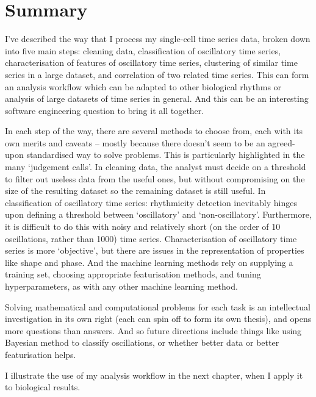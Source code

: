 \section{Summary}
\label{sec:analysis-summary}

I've described the way that I process my single-cell time series data, broken down into five main steps: cleaning data, classification of oscillatory time series, characterisation of features of oscillatory time series, clustering of similar time series in a large dataset, and correlation of two related time series.
This can form an analysis workflow which can be adapted to other biological rhythms or analysis of large datasets of time series in general.
And this can be an interesting software engineering question to bring it all together.

In each step of the way, there are several methods to choose from, each with its own merits and caveats -- mostly because there doesn't seem to be an agreed-upon standardised way to solve problems.
This is particularly highlighted in the many `judgement calls'.
In cleaning data, the analyst must decide on a threshold to filter out useless data from the useful ones, but without compromising on the size of the resulting dataset so the remaining dataset is still useful.
In classification of oscillatory time series: rhythmicity detection inevitably hinges upon defining a threshold between `oscillatory' and `non-oscillatory'.
Furthermore, it is difficult to do this with noisy and relatively short (on the order of 10 oscillations, rather than 1000) time series.
Characterisation of oscillatory time series is more `objective', but there are issues in the representation of properties like shape and phase.
And the machine learning methods rely on supplying a training set, choosing appropriate featurisation methods, and tuning hyperparameters, as with any other machine learning method.

Solving mathematical and computational problems for each task is an intellectual investigation in its own right (each can spin off to form its own thesis), and opens more questions than answers.
And so future directions include things like using Bayesian method to classify oscillations, or whether better data or better featurisation helps.

I illustrate the use of my analysis workflow in the next chapter, when I apply it to biological results.
